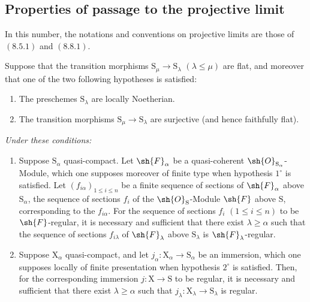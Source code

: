 \subsection{Properties of passage to the projective limit}
\label{subsection:IV.19.8}

In this number, the notations and conventions on projective limits are those of $(8.5.1)$ and $(8.8.1)$.

\begin{proposition}[19.8.1]
\label{IV.19.8.1}
Suppose that the transition morphisms $\mathrm{S}_\mu\to\mathrm{S}_\lambda$ $(\lambda\leqslant\mu)$ are flat, and moreover that one of the two following hypotheses is satisfied:
\begin{enumerate}
\item[$1^\circ$] The preschemes $\mathrm{S}_\lambda$ are locally Noetherian.
\item[$2^\circ$] The transition morphisms $\mathrm{S}_\mu\to\mathrm{S}_\lambda$ are surjective (and hence faithfully flat).
\end{enumerate}

\emph{Under these conditions:}
\begin{enumerate}
\item[\rm(i)] Suppose $\mathrm{S}_\alpha$ quasi-compact. Let $\sh{F}_\alpha$ be a quasi-coherent $\sh{O}_{\mathrm{S}_\alpha}$-Module, which one supposes moreover of finite type when hypothesis $1^\circ$ is satisfied. Let $(f_{i\alpha})_{1\leqslant i\leqslant n}$ be a finite sequence of sections of $\sh{F}_\alpha$ above $\mathrm{S}_\alpha$, the sequence of sections $f_i$ of the $\sh{O}_\mathrm{S}$-Module $\sh{F}$ above $\mathrm{S}$, corresponding to the $f_{i\alpha}$. For the sequence of sections $f_i$ $(1\leqslant i\leqslant n)$ to be $\sh{F}$-regular, it is necessary and sufficient that there exist $\lambda\geqslant\alpha$ such that the sequence of sections $f_{i\lambda}$ of $\sh{F}_\lambda$ above $\mathrm{S}_\lambda$ is $\sh{F}_\lambda$-regular.
\item[\rm(ii)] Suppose $\mathrm{X}_\alpha$ quasi-compact, and let $j_\alpha:\mathrm{X}_\alpha\to\mathrm{S}_\alpha$ be an immersion, which one supposes locally of finite presentation when hypothesis $2^\circ$ is satisfied. Then, for the corresponding immersion $j:\mathrm{X}\to\mathrm{S}$ to be regular, it is necessary and sufficient that there exist $\lambda\geqslant\alpha$ such that $j_\lambda:\mathrm{X}_\lambda\to\mathrm{S}_\lambda$ is regular.
\end{enumerate}
\end{proposition}

